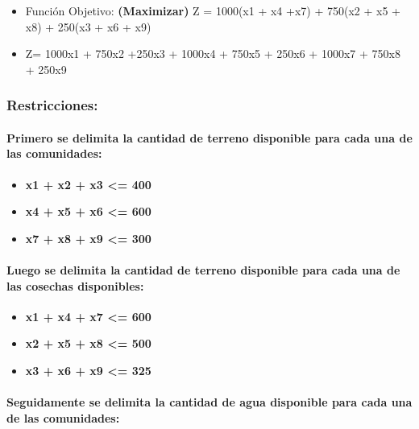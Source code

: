 \documentclass[
]{article}
\providecommand{\tightlist}{%
  \setlength{\itemsep}{0pt}\setlength{\parskip}{0pt}}
\begin{document}
\begin{itemize}
\item
  Función Objetivo: \textbf{(Maximizar)} Z = 1000(x1 + x4 +x7) + 750(x2
  + x5 + x8) + 250(x3 + x6 + x9)
\item
  Z= 1000x1 + 750x2 +250x3 + 1000x4 + 750x5 + 250x6 + 1000x7 + 750x8 +
  250x9
\end{itemize}

\hypertarget{restricciones}{%
\subsubsection{Restricciones:}\label{restricciones}}

\hypertarget{primero-se-delimita-la-cantidad-de-terreno-disponible-para-cada-una-de-las-comunidades}{%
\paragraph{Primero se delimita la cantidad de terreno disponible para
cada una de las
comunidades:}\label{primero-se-delimita-la-cantidad-de-terreno-disponible-para-cada-una-de-las-comunidades}}

\begin{itemize}
\tightlist
\item
  \textbf{x1 + x2 + x3 \textless= 400}
\item
  \textbf{x4 + x5 + x6 \textless= 600}
\item
  \textbf{x7 + x8 + x9 \textless= 300}
\end{itemize}

\hypertarget{luego-se-delimita-la-cantidad-de-terreno-disponible-para-cada-una-de-las-cosechas-disponibles}{%
\paragraph{Luego se delimita la cantidad de terreno disponible para cada
una de las cosechas
disponibles:}\label{luego-se-delimita-la-cantidad-de-terreno-disponible-para-cada-una-de-las-cosechas-disponibles}}

\begin{itemize}
\tightlist
\item
  \textbf{x1 + x4 + x7 \textless= 600}
\item
  \textbf{x2 + x5 + x8 \textless= 500}
\item
  \textbf{x3 + x6 + x9 \textless= 325}
\end{itemize}

\hypertarget{seguidamente-se-delimita-la-cantidad-de-agua-disponible-para-cada-una-de-las-comunidades}{%
\paragraph{Seguidamente se delimita la cantidad de agua disponible para
cada una de las
comunidades:}\label{seguidamente-se-delimita-la-cantidad-de-agua-disponible-para-cada-una-de-las-comunidades}}
\end{document}
